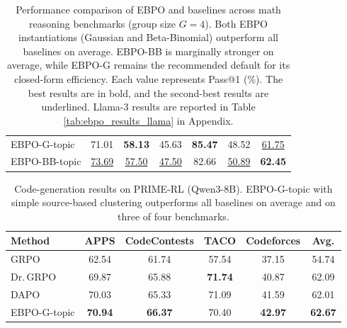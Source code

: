 \documentclass{article}
\theoremstyle{plain}
\theoremstyle{definition}
\theoremstyle{remark}
\newcommand{\oursG}{\textsc{EBPO-G}\xspace}
\newcommand{\oursBB}{\textsc{EBPO-BB}\xspace}
\begin{document}
\begin{table}[t]
{\begin{tabular}{lccccc|c}
\oursG-topic    & 71.01 & \textbf{58.13} & 45.63 & \textbf{85.47} & 48.52 & \underline{61.75} \\
\oursBB-topic   & \underline{73.69} & \underline{57.50} & \underline{47.50} & 82.66 & \underline{50.89} & \textbf{62.45} \\
\bottomrule
\end{tabular}
}
\caption{
Performance comparison of EBPO and baselines across math reasoning benchmarks (group size $G=4$). Both EBPO instantiations (Gaussian and Beta-Binomial) outperform all baselines on average. \oursBB is marginally stronger on average, while \oursG remains the recommended default for its closed-form efficiency. Each value represents Pass@1 (\%). The best results are in bold, and the second-best results are underlined. Llama-3 results are reported in Table \ref{tab:ebpo_results_llama} in Appendix.
}
\label{tab:ebpo_results}
\end{table}


\begin{table}[t]
\centering
\small
\begin{tabular}{lccccc}
\toprule
\textbf{Method} & \textbf{APPS} & \textbf{CodeContests} & \textbf{TACO} & \textbf{Codeforces} & \textbf{Avg.} \\
\midrule
GRPO         & 62.54 & 61.74 & 57.54 & 37.15 & 54.74 \\
Dr.\,GRPO    & 69.87 & 65.88 & \textbf{71.74} & 40.87 & 62.09 \\
DAPO         & 70.03 & 65.33 & 71.09 & 41.59 & 62.01 \\
\oursG-topic & \textbf{70.94} & \textbf{66.37} & 70.40 & \textbf{42.97} & \textbf{62.67} \\
\bottomrule
\end{tabular}
\caption{Code-generation results on PRIME-RL (Qwen3-8B). \oursG-topic with simple source-based clustering outperforms all baselines on average and on three of four benchmarks.}
\label{tab:code_results}
\end{table}
\end{document}
